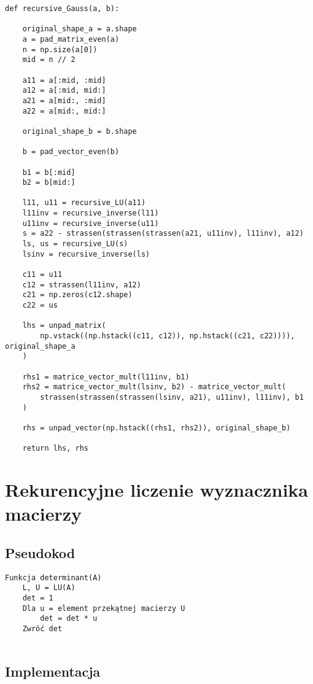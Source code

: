 \documentclass{article}
\begin{document}
\begin{verbatim}
def recursive_Gauss(a, b):

    original_shape_a = a.shape
    a = pad_matrix_even(a)
    n = np.size(a[0])
    mid = n // 2

    a11 = a[:mid, :mid]
    a12 = a[:mid, mid:]
    a21 = a[mid:, :mid]
    a22 = a[mid:, mid:]

    original_shape_b = b.shape

    b = pad_vector_even(b)

    b1 = b[:mid]
    b2 = b[mid:]

    l11, u11 = recursive_LU(a11)
    l11inv = recursive_inverse(l11)
    u11inv = recursive_inverse(u11)
    s = a22 - strassen(strassen(strassen(a21, u11inv), l11inv), a12)
    ls, us = recursive_LU(s)
    lsinv = recursive_inverse(ls)

    c11 = u11
    c12 = strassen(l11inv, a12)
    c21 = np.zeros(c12.shape)
    c22 = us

    lhs = unpad_matrix(
        np.vstack((np.hstack((c11, c12)), np.hstack((c21, c22)))), original_shape_a
    )

    rhs1 = matrice_vector_mult(l11inv, b1)
    rhs2 = matrice_vector_mult(lsinv, b2) - matrice_vector_mult(
        strassen(strassen(strassen(lsinv, a21), u11inv), l11inv), b1
    )

    rhs = unpad_vector(np.hstack((rhs1, rhs2)), original_shape_b)

    return lhs, rhs
\end{verbatim}

\section{Rekurencyjne liczenie wyznacznika macierzy}
\subsection{Pseudokod}

\begin{verbatim}
Funkcja determinant(A)
    L, U = LU(A)
    det = 1
    Dla u = element przekątnej macierzy U
        det = det * u
    Zwróć det
        
\end{verbatim}

\subsection{Implementacja}
\end{document}
